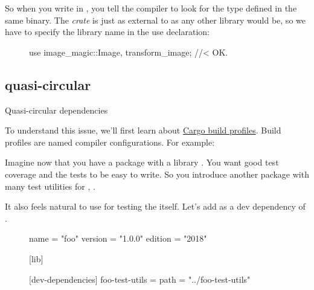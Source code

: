 \documentclass{article}
\begin{document}
So when you write  in , you tell the compiler to look for the type defined in the same binary.
The  \emph{crate} is just as external to  as any other library would be, so we have to specify the library name in the use declaration:

\begin{figure}
\begin{code}[good]
use image_magic::{Image, transform_image}; //< OK.
\end{code}
\end{figure}

\subsection{quasi-circular}{Quasi-circular dependencies}

To understand this issue, we'll first learn about \href{https://doc.rust-lang.org/cargo/reference/profiles.html}{Cargo build profiles}.
Build profiles are named compiler configurations.
For example:

\begin{description}
\end{description}

Imagine now that you have a package with a library .
You want good test coverage and the tests to be easy to write.
So you introduce another package with many test utilities for , .

It also feels natural to use  for testing the  itself.
Let's add  as a dev dependency of .

\begin{figure}
\begin{code}[good]
[package]
name = "foo"
version = "1.0.0"
edition = "2018"

[lib]

[dev-dependencies]
foo-test-utils = { path = "../foo-test-utils" }
\end{code}
\end{figure}
\end{document}
